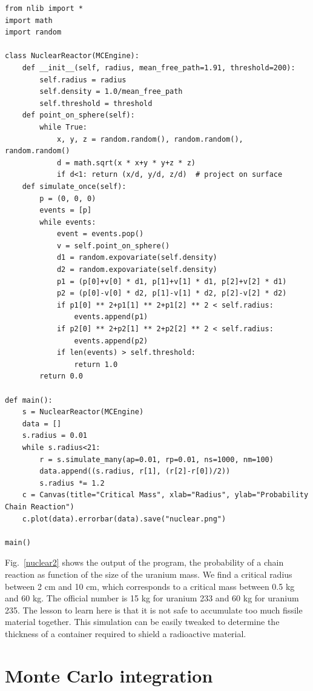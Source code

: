 \documentclass[justified, sixbynine]{tufte-book}
\def\ft{\small\tt}
\theoremstyle{plain}%
\newtheorem * {corollary}{Corollary}
\theoremstyle{definition}
\theoremstyle{remark}
\newtheorem * {remark}{Remark}
\newtheorem * {note}{Note}
\begin{document}
\begin{fullwidth}

\begin{lstlisting}[caption={in file: {\ft nuclear.py}}]
from nlib import * 
import math
import random

class NuclearReactor(MCEngine):
    def __init__(self, radius, mean_free_path=1.91, threshold=200):
        self.radius = radius
        self.density = 1.0/mean_free_path
        self.threshold = threshold
    def point_on_sphere(self):
        while True:
            x, y, z = random.random(), random.random(), random.random()
            d = math.sqrt(x * x+y * y+z * z)
            if d<1: return (x/d, y/d, z/d)  # project on surface
    def simulate_once(self):
        p = (0, 0, 0)
        events = [p]
        while events:
            event = events.pop()
            v = self.point_on_sphere()
            d1 = random.expovariate(self.density)
            d2 = random.expovariate(self.density)
            p1 = (p[0]+v[0] * d1, p[1]+v[1] * d1, p[2]+v[2] * d1)
            p2 = (p[0]-v[0] * d2, p[1]-v[1] * d2, p[2]-v[2] * d2)
            if p1[0] ** 2+p1[1] ** 2+p1[2] ** 2 < self.radius:
                events.append(p1)
            if p2[0] ** 2+p2[1] ** 2+p2[2] ** 2 < self.radius:
                events.append(p2)
            if len(events) > self.threshold:
                return 1.0
        return 0.0

def main():
    s = NuclearReactor(MCEngine)
    data = []
    s.radius = 0.01
    while s.radius<21:
        r = s.simulate_many(ap=0.01, rp=0.01, ns=1000, nm=100)
        data.append((s.radius, r[1], (r[2]-r[0])/2))
        s.radius *= 1.2
    c = Canvas(title="Critical Mass", xlab="Radius", ylab="Probability Chain Reaction")
    c.plot(data).errorbar(data).save("nuclear.png")

main()
\end{lstlisting}

Fig.~\ref{nuclear2} shows the output of the program, the probability of a chain reaction as function of the size of the uranium mass. We find a critical radius between 2 cm and 10 cm, which corresponds to a critical mass between 0.5 kg and 60 kg. The official number is 15 kg for uranium 233 and  60 kg for uranium 235. The lesson to learn here is that it is not safe to accumulate too much fissile material together. This simulation can be easily tweaked to determine the thickness of a container required to shield a radioactive material.

\section{Monte Carlo integration}


\end{fullwidth}
\end{document}
